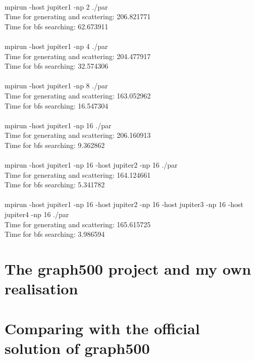 \documentclass[12pt,a4paper]{article}
\begin{document}
\\
mpirun -host jupiter1 -np 2 ./par\\
Time for generating and scattering: 206.821771\\
Time for bfs searching: 62.673911\\
\\
mpirun -host jupiter1 -np 4 ./par\\
Time for generating and scattering: 204.477917\\
Time for bfs searching: 32.574306\\
\\
mpirun -host jupiter1 -np 8 ./par\\
Time for generating and scattering: 163.052962\\
Time for bfs searching: 16.547304\\
\\
mpirun -host jupiter1 -np 16 ./par\\
Time for generating and scattering: 206.160913\\
Time for bfs searching: 9.362862\\
\\
mpirun -host jupiter1 -np 16 -host jupiter2 -np 16 ./par\\
Time for generating and scattering: 164.124661\\
Time for bfs searching: 5.341782\\
\\
mpirun -host jupiter1 -np 16 -host jupiter2 -np 16 -host jupiter3 -np 16 -host jupiter4 -np 16 ./par\\
Time for generating and scattering: 165.615725\\
Time for bfs searching: 3.986594\\


\section{The graph500 project and my own realisation}
\label{sec:graph500}

\section{Comparing with the official solution of graph500}
\label{sec:Comparing}
\end{document}
